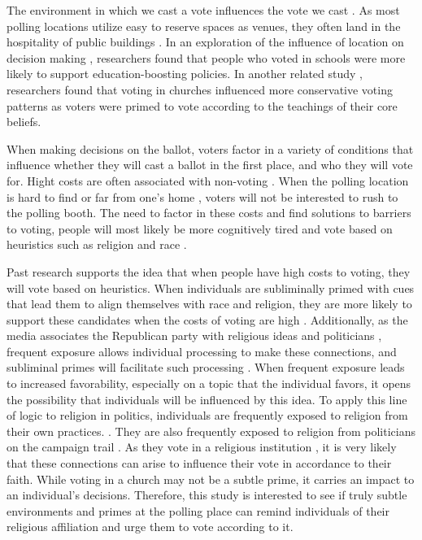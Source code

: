 \documentclass[letterpaper,man,natbib,noextraspace,12pt]{apa6}  %
\begin{document}
The environment in which we cast a vote influences the vote we cast \citep{berger_contextual_2008}. As most polling locations utilize easy to reserve spaces as venues, they often land in the hospitality of public buildings \citep{barreto_are_2009}. In an exploration of the influence of location on decision making \citep{berger_contextual_2008}, researchers found that people who voted in schools were more likely to support education-boosting policies. In another related study \citep{rutchick_deus_2010}, researchers found that voting in churches influenced more conservative voting patterns as voters were primed to vote according to the teachings of their core beliefs. 

When making decisions on the ballot, voters factor in a variety of conditions that influence whether they will cast a ballot in the first place, and who they will vote for. Hight costs are often associated with non-voting \citep{haspel_location_2005}. When the polling location is hard to find \citep{barreto_are_2009} or far from one’s home \citep{haspel_location_2005}, voters will not be interested to rush to the polling booth. The need to factor in these costs and find solutions to barriers to voting, people will most likely be more cognitively tired and vote based on heuristics such as religion and race \citep{weber_courting_2012}. 

Past research supports the idea that when people have high costs to voting, they will vote based on heuristics. When individuals are subliminally primed with cues that lead them to align themselves with race and religion, they are more likely to support these candidates when the costs of voting are high \citep{kam_implicit_2007}. Additionally, as the media associates the Republican party with religious ideas and politicians \citep{calfano_god_2009, mclaughlin_cueing_2014}, frequent exposure allows individual processing to make these connections, and subliminal primes will facilitate such processing \citep{kahneman_thinking_2012}. When frequent exposure leads to increased favorability, especially on a topic that the individual favors, it opens the possibility that individuals will be influenced by this idea. To apply this line of logic to religion in politics, individuals are frequently exposed to religion from their own practices. \citep{putnam_american_2010}. They are also frequently exposed to religion from politicians on the campaign trail \citep{domke_god_2008}. As they vote in a religious institution \citep{rutchick_deus_2010}, it is very likely that these connections can arise to influence their vote in accordance to their faith. While voting in a church may not be a subtle prime, it carries an impact to an individual’s decisions. Therefore, this study is interested to see if truly subtle environments and primes at the polling place can remind individuals of their religious affiliation and urge them to vote according to it. 
\end{document}
